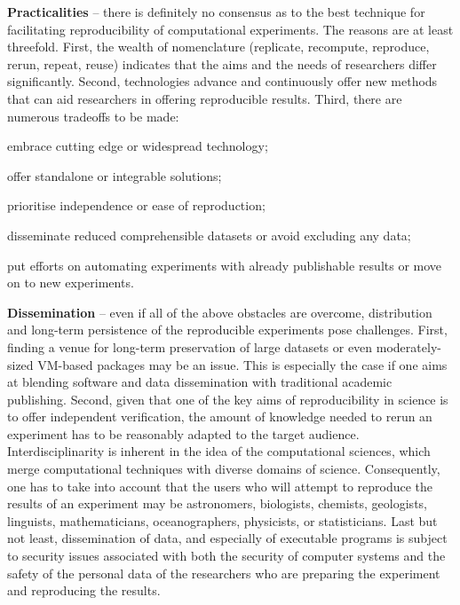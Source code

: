 {\bf Practicalities} -- there is definitely no consensus as to the
  best technique for facilitating reproducibility of computational
  experiments. 
The reasons are at least threefold. 
First, the wealth of nomenclature (replicate, recompute, reproduce, 
  rerun, repeat, reuse) indicates that the aims and the needs of researchers
  differ significantly.
Second, technologies advance and continuously offer new methods that can
  aid researchers in offering reproducible results.
Third, there are numerous tradeoffs to be made: 
  \begin{inparaenum}[(i)]
  \item embrace cutting edge or widespread technology; 
  \item offer standalone or integrable solutions; 
  \item prioritise independence or ease of reproduction; 
  \item disseminate reduced comprehensible datasets or avoid excluding any data;
  \item put efforts on automating experiments with already publishable results
  or move on to new experiments.
  \end{inparaenum}
    
{\bf Dissemination} -- even if all of the above obstacles are overcome, 
  distribution and long-term persistence of the reproducible experiments
  pose challenges.
First, finding a venue for long-term preservation of large datasets or even 
  moderately-sized VM-based packages may be an issue.
This is especially the case if one aims at blending software and data
  dissemination with traditional academic publishing.
Second, given that one of the key aims of reproducibility in science
  is to offer independent verification, the amount of knowledge 
  needed to rerun an experiment has to be reasonably adapted to the
  target audience.
Interdisciplinarity is inherent in the idea of the computational
sciences, which
  merge computational techniques with diverse domains of science.
Consequently, one has to take into account that the users who will attempt to
  reproduce the results of an experiment may be
  astronomers, biologists, chemists, geologists, linguists, mathematicians,
  oceanographers, physicists, or statisticians.
Last but not least, dissemination of data, and especially of executable
  programs is subject to security issues associated with both the security
  of computer systems and the safety of the personal data of the researchers who
  are preparing the experiment and reproducing the results.
